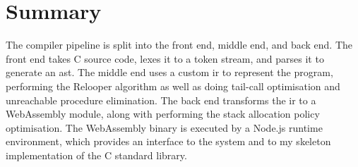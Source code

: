 \documentclass[00-main.tex]{subfiles}
\begin{document}
\section{Summary}

The compiler pipeline is split into the front end, middle end, and back end.
The front end takes C source code, lexes it to a token stream, and parses it to generate an \gls{ast}.
The middle end uses a custom \gls{ir} to represent the program, performing the Relooper algorithm as well as doing tail-call optimisation and unreachable procedure elimination.
The back end transforms the \gls{ir} to a WebAssembly module, along with performing the stack allocation policy optimisation.
The WebAssembly binary is executed by a Node.js runtime environment, which provides an interface to the system and to my skeleton implementation of the C standard library.
\end{document}
